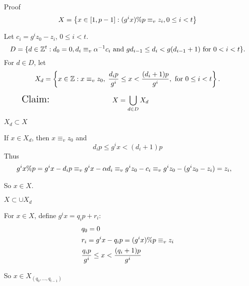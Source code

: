 \begin{frame}{Proof}
  \[
    X = \left \{x \in [1,p-1]: (g^i x) \% p \equiv_v z_i, 0 \leq i < t \right \}
    \]

Let $c_i = g^{i}z_{0} - z_{i}$, $0 \leq i < t$.
  \[
    D = \{d \in \mathbb{Z}^t:d_0 = 0,  d_i \equiv_v \alpha^{-1}c_i\mbox{ and } 
          gd_{i-1} \leq d_i < g(d_{i-1}+1) \mbox{ for } 0 < i < t  \}.
  \]
  For $d \in D$, let\[
    X_{d} = \left \{x \in \mathbb{Z}: x \equiv_v z_0,\; \frac{d_{i}p}{g^i} 
    \leq x < \frac{(d_{i}+1)p}{g^i}, \mbox{ for } 0 \leq i < t \right \}.
  \]
 
  \begin{align*}
\mbox{\Large Claim:         } \hspace{3cm} &   X = \bigcup_{d \in D} X_d & \hspace{4cm}
  \end{align*}


\end{frame}

\begin{frame}{$X_d \subset X$}

If $x \in X_{d}$, then $x \equiv_v z_0$ and 
  \[
    d_{i}p \leq g^ix < (d_{i}+1)p 
  \]
  Thus 
  \begin{align*}
    g^ix \%  p &= g^ix-d_{i}p 
                \equiv_v g^ix-\alpha d_i 
                \equiv_v g^iz_0 - c_i 
                \equiv_v g^iz_0 - (g^iz_0 - z_i) = z_i,
  \end{align*}

  So $x \in X$.



\end{frame}

\begin{frame}{$X \subset \cup X_d$}

  For $x \in X$, define $g^ix = q_ip + r_i$:
\begin{align*}
&  q_0 = 0 \\
&  r_i = g^ix - q_ip = (g^ix) \% p \equiv_v z_i \\
&  \frac{q_{i}p}{g^i} \leq x < \frac{(q_{i}+1)p}{g^i}
  \end{align*}

  So $x \in X_{(q_0,\ldots,q_{t-1})}$



\end{frame}

